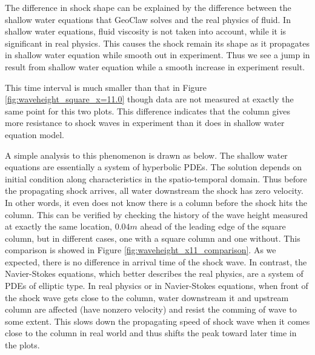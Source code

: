 \documentclass[11pt]{article}
\begin{document}
The difference in shock shape can be explained by the difference between the shallow water equations that GeoClaw solves and the real physics of fluid. 
In shallow water equations, fluid viscosity is not taken into account, while it is significant in real physics.
This causes the shock remain its shape as it propagates in shallow water equation while smooth out in experiment.
Thus we see a jump in result from shallow water equation while a smooth increase in experiment result.
\par
This time interval is much smaller than that in Figure \ref{fig:waveheight_square_x=11.0} though data are not measured at exactly the same point for this two plots. 
This difference indicates that the column gives more resistance to shock waves in experiment than it does in shallow water equation model. 
\par
A simple analysis to this phenomenon is drawn as below.
The shallow water equations are essentially a system of hyperbolic PDEs. The solution depends on initial condition along characteristics in the spatio-temporal domain. 
Thus before the propagating shock arrives, all water downstream the shock has zero velocity. 
In other words, it even does not know there is a column before the shock hits the column.
This can be verified by checking the history of the wave height measured at exactly the same location, $0.04m$ ahead of the leading edge of the square column, but in different cases, one with a square column and one without.
This comparison is showed in Figure \ref{fig:waveheight_x11_comparison}. As we expected, there is no difference in arrival time of the shock wave.
In contrast, the Navier-Stokes equations, which better describes the real physics, are a system of PDEs of elliptic type. 
In real physics or in Navier-Stokes equations, when front of the shock wave gets close to the column, water downstream it and upstream column are affected (have nonzero velocity) and resist the comming of wave to some extent. 
This slows down the propagating speed of shock wave when it comes close to the column in real world and thus shifts the peak toward later time in the plots.
\end{document}

